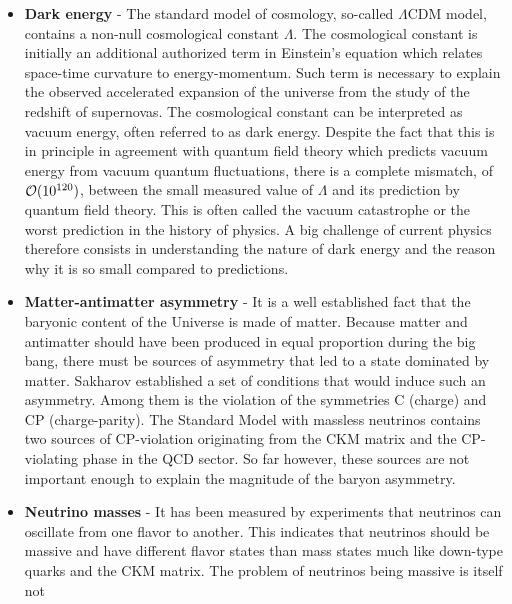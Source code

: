    \begin{itemize}
        \item \textbf{Dark energy} - The standard model of cosmology, so-called $\Lambda$CDM model,
            contains a non-null cosmological constant $\Lambda$. The cosmological
            constant is initially an additional authorized term in Einstein's equation
            which relates space-time curvature to energy-momentum. Such term is necessary
            to explain the observed accelerated expansion of the universe from the study
            of the redshift of supernovas. The cosmological constant can be interpreted
            as vacuum energy, often referred to as dark energy. Despite the fact that this
            is in principle in agreement with quantum field theory which predicts vacuum
            energy from vacuum quantum fluctuations, there is a complete mismatch, of $\mathcal{O}(10^{120})$,
            between the small measured value of $\Lambda$ and its prediction
            by quantum field theory. This is often called the vacuum catastrophe or the worst
            prediction in the history of physics. A big challenge of current physics therefore
            consists in understanding the nature of dark energy and the reason why it is so small
            compared to predictions.
        \item \textbf{Matter-antimatter asymmetry} - It is a well established fact that
            the baryonic content of the Universe is made of matter. Because matter and antimatter
            should have been produced in equal proportion during the big bang, there must
            be sources of asymmetry that led to a state dominated by matter. Sakharov
            established a set of conditions that would
            induce such an asymmetry. Among them is the violation of the symmetries C (charge)
            and CP (charge-parity). The Standard Model
            with massless neutrinos contains two sources of CP-violation originating from
            the CKM matrix and the CP-violating phase in the QCD sector. So far however,
            these sources are not important enough to explain the magnitude of the baryon
            asymmetry.
        \item \textbf{Neutrino masses} - It has been measured by experiments that neutrinos
            can oscillate from one flavor to another. This indicates that neutrinos should
            be massive and have different flavor states than mass states much like down-type
            quarks and the CKM matrix. The problem of neutrinos being massive is itself not

\end{itemize}
